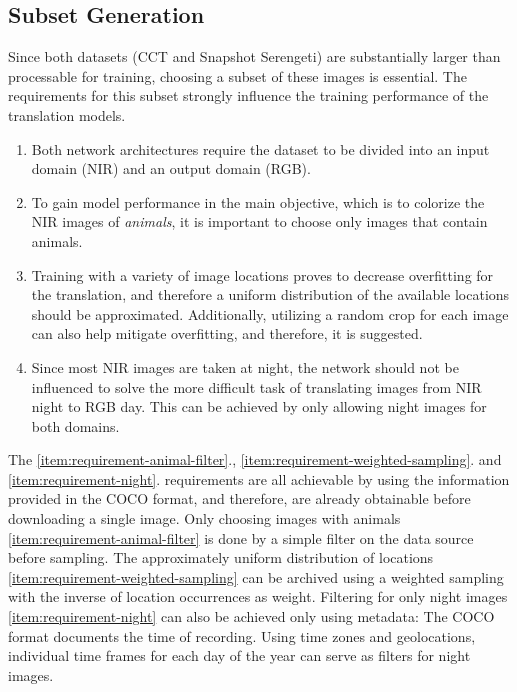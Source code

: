 \subsection{Subset Generation}
\label{sec:subset-generation}
Since both datasets (CCT and Snapshot Serengeti) are substantially larger than processable for training, choosing a subset of these images is essential.
The requirements for this subset strongly influence the training performance of the translation models.

\begin{enumerate}
   \item Both network architectures require the dataset to be divided into an input domain (NIR) and an output domain (RGB). \label{item:requirement-split}
   \item To gain model performance in the main objective, which is to colorize the NIR images of \textit{animals}, it is important to choose only images that contain animals. \label{item:requirement-animal-filter}
   \item Training with a variety of image locations proves to decrease overfitting for the translation, and therefore a uniform distribution of the available locations should be approximated.
         Additionally, utilizing a random crop for each image can also help mitigate overfitting, and therefore, it is suggested. \label{item:requirement-weighted-sampling}
   \item Since most NIR images are taken at night, the network should not be influenced to solve the more difficult
         task of translating images from NIR night to RGB day. This can be achieved by only allowing night images for both
         domains. \label{item:requirement-night}
\end{enumerate}


The \ref{item:requirement-animal-filter}., \ref{item:requirement-weighted-sampling}. and \ref{item:requirement-night}. requirements are all achievable by using the information provided in the COCO format, and therefore,
are already obtainable before downloading a single image.
Only choosing images with animals \ref{item:requirement-animal-filter} is done by a simple filter on the data source before sampling.
The approximately uniform distribution of locations \ref{item:requirement-weighted-sampling} can be archived using a weighted sampling with the inverse of location occurrences as weight.
Filtering for only night images \ref{item:requirement-night} can also be achieved only using metadata:
The COCO format documents the time of recording. Using time zones and geolocations, individual time frames for each day of the year can serve as filters for night images.

